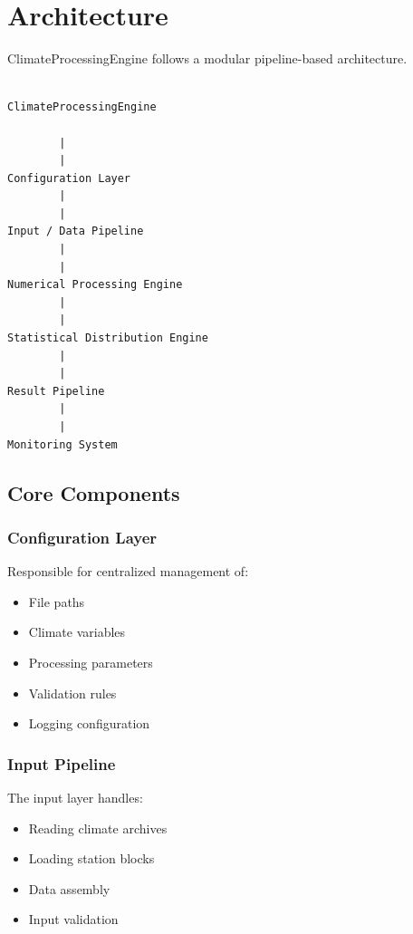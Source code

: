 \documentclass[11pt,a4paper]{article}
\begin{document}
\section{Architecture}


ClimateProcessingEngine follows a modular pipeline-based architecture.


\begin{verbatim}

ClimateProcessingEngine

        |
        |
Configuration Layer
        |
        |
Input / Data Pipeline
        |
        |
Numerical Processing Engine
        |
        |
Statistical Distribution Engine
        |
        |
Result Pipeline
        |
        |
Monitoring System

\end{verbatim}



\subsection{Core Components}



\subsubsection{Configuration Layer}


Responsible for centralized management of:


\begin{itemize}

\item File paths
\item Climate variables
\item Processing parameters
\item Validation rules
\item Logging configuration

\end{itemize}



\subsubsection{Input Pipeline}


The input layer handles:


\begin{itemize}

\item Reading climate archives
\item Loading station blocks
\item Data assembly
\item Input validation

\end{itemize}
\end{document}
